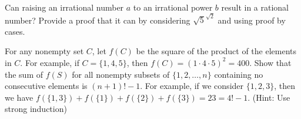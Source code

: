 \documentclass[twoside,12pt]{article}
\begin{document}


\begin{problem}{15}
Can raising an irrational number $a$ to an irrational power $b$ result in a
rational number? Provide a proof that it can by considering $\sqrt{5}^{\sqrt{2}}$
and using proof by cases.
\end{problem}

\begin{problem}{15}
For any nonempty set $C$, let $f(C)$ be the square of the product of the elements in $C$.  For example, if $C = \{ 1, 4, 5 \}$, then $f(C) = (1 \cdot 4 \cdot 5)^2 = 400$.  Show that the sum of $f(S)$ for all nonempty subsets of $\{1, 2, \ldots, n\}$ containing no consecutive elements is $ (n+1)! - 1$.  For example, if we consider $\{1, 2, 3\}$, then we have $f(\{1, 3\}) + f(\{1\}) + f(\{2\}) + f(\{3\}) = 23 = 4! - 1$.  (Hint: Use strong induction)
\end{problem}
\end{document}
